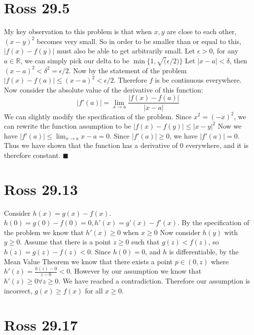 \documentclass[12pt]{article}
\newcommand{\R}{\mathbb{R}}
\begin{document}
\section{Ross 29.5}
My key observation to this problem is that when $x,y$ are close to each other, $(x-y)^2$ becomes very small. So in order to be smaller than or equal to this, $|f(x)-f(y)|$ must also be able to get arbitrarily small.
\newline
Let $\epsilon > 0$, for any $a \in \R$, we can simply pick our delta to be $\min\{1, \sqrt(\epsilon/2)\}$ Let $|x-a|<\delta$, then $(x-a)^2 < \delta ^2 = \epsilon/2$. Now by the statement of the problem $|f(x)-f(a)|\leq (x-a)^2 <\epsilon/2$. Therefore $f$ is be continuous everywhere.
\newline
Now consider the absolute value of the derivative of this function:
$$|f'(a)| = \lim_{x \to a}\frac{|f(x)-f(a)|}{|x-a|}$$
We can slightly modify the specification of the problem. Since $x^2 = (-x)^2$, we can rewrite the function assumption to be $|f(x)-f(y)|\leq |x-y|^2$
\newline
Now we have $|f'(a)| \leq \lim_{x \to a}x - a = 0$. Since $|f'(a)| \geq 0$, we have $|f'(a)| = 0$. Thus we have shown that the function has a derivative of $0$ everywhere, and it is therefore constant.
$\blacksquare$
\newpage


\section{Ross 29.13}
Consider $h(x)=g(x)-f(x)$. $h(0) = g(0)-f(0)=0, h'(x)=g'(x)-f'(x)$. By the specification of the problem we know that $h'(x)\geq 0 $ when $x \geq 0$
\newline
Now consider $h(y)$ with $y\geq 0$. Assume that there is a point $z \geq 0$ such that $g(z)<f(z)$, so $h(z)= g(z)-f(z) < 0$. Since $h(0)=0$, and $h$ is differentiable, by the Mean Value Theorem we know that there exists a point $p \in (0,z)$ where $h'(z)=\frac{h(z)-0}{z-0}<0$. However by our assumption we know that $h'(z) \geq 0 \forall z \geq 0$. We have reached a contradiction.
\newline
Therefore our assumption is incorrect, $g(x)\geq f(x)$ for all $x \geq 0$.
\newpage


\section{Ross 29.17}
\end{document}

